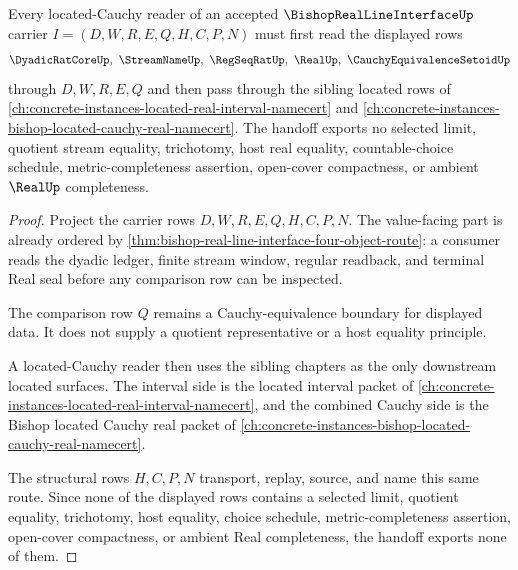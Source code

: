 \begin{theorem}
\label{thm:bishop-real-line-interface-located-cauchy-handoff}
Every located-Cauchy reader of an accepted $\BishopRealLineInterfaceUp$ carrier $I=(D,W,R,E,Q,H,C,P,N)$ must first read the displayed rows
$$
\DyadicRatCoreUp,\ \StreamNameUp,\ \RegSeqRatUp,\ \RealUp,\ \CauchyEquivalenceSetoidUp
$$
through $D,W,R,E,Q$ and then pass through the sibling located rows of \autoref{ch:concrete-instances-located-real-interval-namecert} and \autoref{ch:concrete-instances-bishop-located-cauchy-real-namecert}. The handoff exports no selected limit, quotient stream equality, trichotomy, host real equality, countable-choice schedule, metric-completeness assertion, open-cover compactness, or ambient $\RealUp$ completeness.
\end{theorem}
\begin{proof}
Project the carrier rows $D,W,R,E,Q,H,C,P,N$. The value-facing part is already ordered by \autoref{thm:bishop-real-line-interface-four-object-route}: a consumer reads the dyadic ledger, finite stream window, regular readback, and terminal Real seal before any comparison row can be inspected.

The comparison row $Q$ remains a Cauchy-equivalence boundary for displayed data. It does not supply a quotient representative or a host equality principle.

A located-Cauchy reader then uses the sibling chapters as the only downstream located surfaces. The interval side is the located interval packet of \autoref{ch:concrete-instances-located-real-interval-namecert}, and the combined Cauchy side is the Bishop located Cauchy real packet of \autoref{ch:concrete-instances-bishop-located-cauchy-real-namecert}.

The structural rows $H,C,P,N$ transport, replay, source, and name this same route. Since none of the displayed rows contains a selected limit, quotient equality, trichotomy, host equality, choice schedule, metric-completeness assertion, open-cover compactness, or ambient Real completeness, the handoff exports none of them.
\end{proof}

